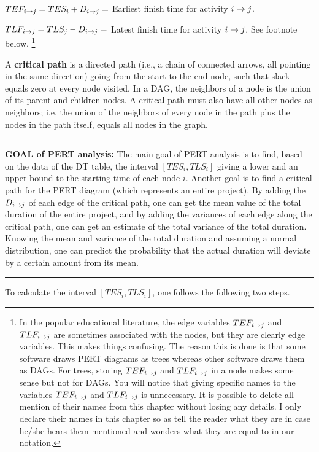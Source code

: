 $TEF_{i\rightarrow j}=TES_i + D_{i\rightarrow j}=$ 
Earliest finish 
time for activity $i\rightarrow j$.

$TLF_{i\rightarrow j}=TLS_j-D_{i\rightarrow j}=$ 
 Latest finish 
time for activity $i\rightarrow j$. See footnote below.
\footnote{
In the popular educational literature,
the edge variables
$TEF_{i\rightarrow j}$
and $TLF_{i\rightarrow j}$
are sometimes associated 
 with
the nodes, but they 
are clearly edge variables.
This makes things confusing.
The reason this is done is
that some software draws PERT diagrams as
trees whereas other software
draws them as DAGs. For trees,
storing $TEF_{i\rightarrow j}$
and $TLF_{i\rightarrow j}$ in a node
makes some sense but not for DAGs.
You will notice that giving specific names
to the variables
$TEF_{i\rightarrow j}$
and $TLF_{i\rightarrow j}$ 
is  unnecessary.
It is possible
to delete all 
mention of their names 
from this chapter
without
losing any details. I only declare
their names 
in this chapter so as tell the reader 
what they are in case he/she
hears them mentioned
and wonders what they are
equal to in our notation.}



A {\bf critical path} is a directed path
(i.e., a chain of connected arrows,
all pointing in the same direction)
going from the start  to the end node, such that 
slack equals zero at every node visited.
In a DAG, the neighbors
of a node is the union of its parent
 and children nodes.
A critical path must also have all other nodes 
as neighbors; i.e, 
the union of the neighbors
of  every node in the path  plus
the nodes in the path itself, equals 
all nodes in the graph. 

\hrule
{\bf GOAL of PERT analysis:} The main
goal
of PERT analysis
is to find,
based on the data of the DT table, 
the interval $[TES_i, TLS_i]$
giving 
a lower and an upper bound
to the starting time of each node $i$.
Another goal is 
to find a critical path
for the PERT diagram (which
represents  an entire project).
By adding the $D_{i\rightarrow j}$
of each edge of the
critical path,
one can
get the mean value of the total
duration
of the entire project,
and by adding the
variances of each 
edge along the critical path,
one can get an estimate
of the total variance
of the total duration.
Knowing the mean and variance
of the total
duration
and assuming a normal distribution,
one can
predict the probability
that the 
actual duration
will
deviate by a certain amount from its mean.
\hrule

To calculate the interval $[TES_i, TLS_i]$,
one follows the
following two steps.

